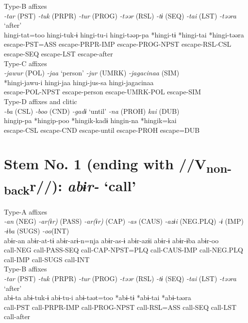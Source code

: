 \ea Type-B affixes\\
\glll \textit{-tar} (PST)  \textit{-tuk} (PRPR)  \textit{-tur} (PROG)  \textit{-təər} (RSL)  \textit{-tɨ} (SEQ)  \textit{-tai} (LST)  \textit{-təəra} ‘after’\\
hingi-tat=too  hingi-tuk-ɨ  hingi-tu-i  hingi-təəp-pa  *hingi-tɨ  *hingi-tai  *hingi-təəra\\
escape-PST=ASS  escape-PRPR-IMP  escape-PROG-NPST  escape-RSL-CSL  escape-SEQ  escape-LST  escape-after\\
\ex Type-C affixes\\
\glll \textit{-jawur} (POL)  \textit{-jaa} ‘person’  \textit{-jur} (UMRK)  \textit{-jagacinaa} (SIM)\\
*hingi-jawu-i  hingi-jaa  hingi-jus-sa  hingi-jagacinaa\\
escape-POL-NPST  escape-person  escape-UMRK-POL  escape-SIM\\
\ex Type-D affixes and clitic\\
\glll \textit{-ba} (CSL)  \textit{-boo} (CND)  \textit{-gadɨ} ‘until’  \textit{-na} (PROH)  \textit{kai} (DUB)\\
hingip-pa  *hingip-poo  *hingik-kadɨ  hingin-na  *hingik=kai\\
escape-CSL  escape-CND  escape-until  escape-PROH  escape=DUB\\
\z

\section{Stem No. 1 (ending with //V\textsubscript{non-back}r//): \textit{abɨr-} ‘call’}

\ea Type-A affixes\\
\glll \textit{-an} (NEG)  \textit{-ar(ɨr)} (PASS)  \textit{-ar(ɨr)} (CAP)  \textit{-as} (CAUS)  \textit{-azɨi} (NEG.PLQ)  \textit{-ɨ} (IMP)  \textit{-ɨba} (SUGS)  \textit{-oo}(INT)\\
abɨr-an  abɨr-at-tɨ  abɨr-arɨ-n=nja  abɨr-as-ɨ  abɨr-azɨi  abɨr-ɨ  abɨr-ɨba  abɨr-oo\\
call-NEG  call-PASS-SEQ  call-CAP-NPST=PLQ  call-CAUS-IMP  call-NEG.PLQ  call-IMP  call-SUGS  call-INT\\


\ex Type-B affixes\\
\glll \textit{-tar} (PST)  \textit{-tuk} (PRPR)  \textit{-tur} (PROG)  \textit{-təər} (RSL)  \textit{-tɨ} (SEQ)  \textit{-tai} (LST)  \textit{-təəra} ‘after’\\
abɨ-ta  abɨ-tuk-ɨ  abɨ-tu-i  abɨ-təət=too  *abɨ-tɨ  *abɨ-tai  *abɨ-təəra\\
call-PST  call-PRPR-IMP  call-PROG-NPST  call-RSL=ASS  call-SEQ  call-LST  call-after\\



